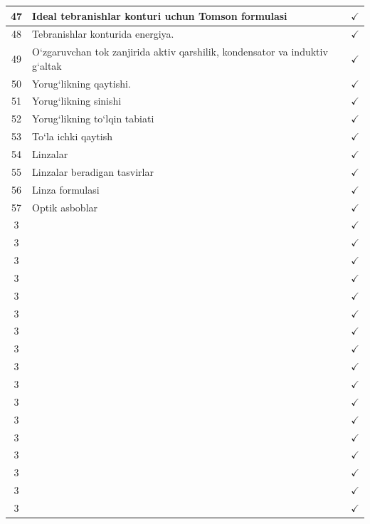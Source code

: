 \begin{table}[h]
\begin{tabular}{|c|p{13cm}|c|}
        47 &  Ideal tebranishlar konturi uchun Tomson formulasi  & $\checkmark$\\ \hline
        48 & Tebranishlar konturida energiya.   &$\checkmark$ \\ \hline
        49 & O‘zgaruvchan tok zanjirida aktiv  qarshilik, kondensator va induktiv g‘altak   & $\checkmark$\\ \hline
        50 & Yorug‘likning qaytishi.   &$\checkmark$ \\ \hline
        51 & Yorug‘likning sinishi   &$\checkmark$ \\ \hline
        52 & Yorug‘likning to‘lqin tabiati   &$\checkmark$ \\ \hline
        53 & To‘la ichki qaytish   &$\checkmark$ \\ \hline
        54 & Linzalar   & $\checkmark$\\ \hline
        55 & Linzalar beradigan tasvirlar   &$\checkmark$ \\ \hline
        56 &  Linza formulasi  & $\checkmark$\\ \hline
        57 &  Optik asboblar  &$\checkmark$ \\ \hline
        3 &    &$\checkmark$ \\ \hline
        3 &    &$\checkmark$ \\ \hline
        3 &    &$\checkmark$ \\ \hline
        3 &    & $\checkmark$\\ \hline
        3 &    &$\checkmark$ \\ \hline
        3 &    &$\checkmark$ \\ \hline
        3 &    &$\checkmark$ \\ \hline
        3 &    &$\checkmark$ \\ \hline
        3 &    & $\checkmark$\\ \hline
        3 &    &$\checkmark$ \\ \hline
        3 &    & $\checkmark$\\ \hline
        3 &    &$\checkmark$ \\ \hline
        3 &    &$\checkmark$ \\ \hline
        3 &    &$\checkmark$ \\ \hline
        3 &    &$\checkmark$ \\ \hline
        3 &    & $\checkmark$\\ \hline
        3 &    &$\checkmark$ \\ \hline


        
    \end{tabular}
    
    \label{tab:placeholder}
\end{table}